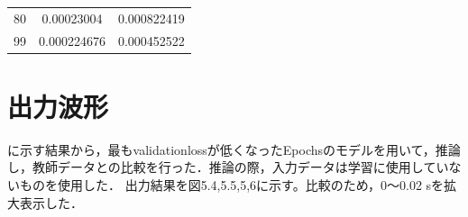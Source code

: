 \documentclass{jreport}		%
\begin{document}
\begin{table}
\begin{center}
\begin{tabular}{c|cc}
80&0.00023004&0.000822419 \\
99&0.000224676&0.000452522 \\ \hline
  \end{tabular}
  \end{center}
\end{table}

\clearpage

\section{出力波形}
に示す結果から，最もvalidationlossが低くなったEpochsのモデルを用いて，推論し，教師データとの比較を行った．推論の際，入力データは学習に使用していないものを使用した．
出力結果を図5.4,5.5,5,6に示す。比較のため，0～0.02 sを拡大表示した．
\end{document}
